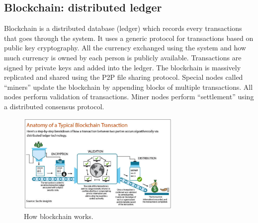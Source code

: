 \documentclass[twoside]{article}
\begin{document}
\subsection{Blockchain: distributed ledger}

Blockchain is a distributed database (ledger) which records every transactions that goes through the system. It uses a generic protocol for transactions based on public key cryptography. All the currency exchanged using the system and how much currency is owned by each person is publicly available. Transactions are signed by private keys and added into the ledger. The blockchain is massively replicated and shared using the P2P file sharing protocol. Special nodes called ``miners'' update the blockchain by appending blocks of multiple transactions. All nodes perform validation of transactions. Miner nodes perform ``settlement'' using a distributed consensus protocol.

\begin{figure}[H]
\centering
\includegraphics[width=0.7\textwidth]{blockchain.png}
\caption{How blockchain works.}
\end{figure}
\end{document}
